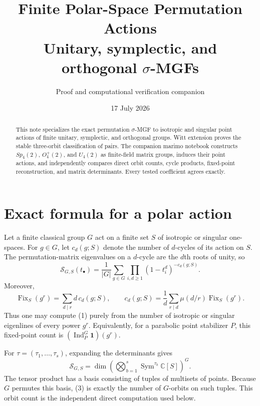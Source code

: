 \documentclass[10pt]{article}
\title{\color{navy}\textbf{Finite Polar-Space Permutation Actions}\\[2mm]
\large Unitary, symplectic, and orthogonal $\sigma$-MGFs}
\author{Proof and computational verification companion}
\date{17 July 2026}
\newcommand{\Sym}{\operatorname{Sym}}
\newcommand{\Fix}{\operatorname{Fix}}
\newcommand{\Sg}{\mathcal S}
\begin{document}
\maketitle

\begin{abstract}
This note specializes the exact permutation $\sigma$-MGF to isotropic and
singular point actions of finite unitary, symplectic, and orthogonal groups.
Witt extension proves the stable three-orbit classification of pairs.  The
companion marimo notebook constructs $Sp_4(2)$, $O_4^+(2)$, and $U_4(2)$ as
finite-field matrix groups, induces their point actions, and independently
compares direct orbit counts, cycle products, fixed-point reconstruction, and
matrix determinants.  Every tested coefficient agrees exactly.
\end{abstract}

\section{Exact formula for a polar action}
Let a finite classical group $G$ act on a finite set $S$ of isotropic or
singular one-spaces.  For $g\in G$, let $c_d(g;S)$ denote the number of
$d$-cycles of its action on $S$.  The permutation-matrix eigenvalues on a
$d$-cycle are the $d$th roots of unity, so
\begin{equation}
 \boxed{\Sg_{G,S}(t_\bullet)=\frac1{|G|}\sum_{g\in G}
 \prod_{i,d\geq1}(1-t_i^d)^{-c_d(g;S)}.}
\end{equation}
Moreover,
\begin{equation}
 \Fix_S(g^r)=\sum_{d\mid r}d\,c_d(g;S),\qquad
 c_d(g;S)=\frac1d\sum_{r\mid d}\mu(d/r)\Fix_S(g^r).
\end{equation}
Thus one may compute (1) purely from the number of isotropic or singular
eigenlines of every power $g^r$.  Equivalently, for a parabolic point
stabilizer $P$, this fixed-point count is
$(\operatorname{Ind}_P^G\mathbf1)(g^r)$.

For $\tau=(\tau_1,\ldots,\tau_s)$, expanding the determinants gives
\begin{equation}
 [m_\tau]\Sg_{G,S}=\dim\left(
 \bigotimes_{b=1}^s\Sym^{\tau_b}\mathbb C[S]\right)^G.
\end{equation}
The tensor product has a basis consisting of tuples of multisets of points.
Because $G$ permutes this basis, (3) is exactly the number of $G$-orbits on
such tuples.  This orbit count is the independent direct computation used
below.
\end{document}
